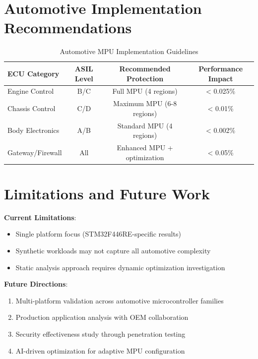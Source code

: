 \section{Automotive Implementation Recommendations}

\begin{table}[h]
\centering
\caption{Automotive MPU Implementation Guidelines}
\begin{tabular}{@{}lccc@{}}
\toprule
ECU Category & ASIL Level & Recommended Protection & Performance Impact \\
\midrule
Engine Control & B/C & Full MPU (4 regions) & < 0.025\% \\
Chassis Control & C/D & Maximum MPU (6-8 regions) & < 0.01\% \\
Body Electronics & A/B & Standard MPU (4 regions) & < 0.002\% \\
Gateway/Firewall & All & Enhanced MPU + optimization & < 0.05\% \\
\bottomrule
\end{tabular}
\end{table}

\section{Limitations and Future Work}

\textbf{Current Limitations}:
\begin{itemize}
    \item Single platform focus (STM32F446RE-specific results)
    \item Synthetic workloads may not capture all automotive complexity
    \item Static analysis approach requires dynamic optimization investigation
\end{itemize}

\textbf{Future Directions}:
\begin{enumerate}
    \item Multi-platform validation across automotive microcontroller families
    \item Production application analysis with OEM collaboration
    \item Security effectiveness study through penetration testing
    \item AI-driven optimization for adaptive MPU configuration
\end{enumerate}